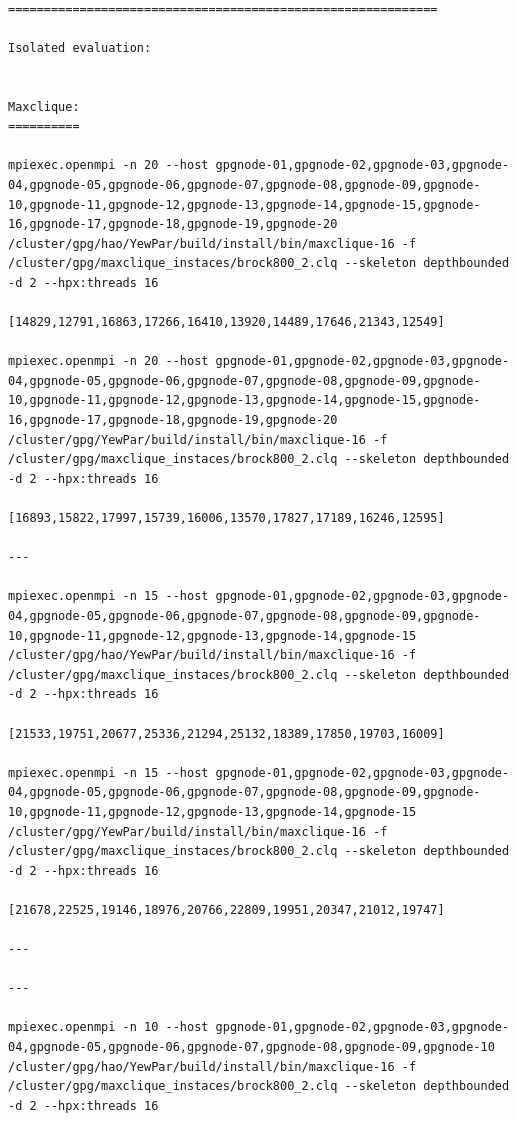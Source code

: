 \documentclass{mproj}
\begin{document}
\begin{lstlisting}

============================================================

Isolated evaluation:


Maxclique:
==========

mpiexec.openmpi -n 20 --host gpgnode-01,gpgnode-02,gpgnode-03,gpgnode-04,gpgnode-05,gpgnode-06,gpgnode-07,gpgnode-08,gpgnode-09,gpgnode-10,gpgnode-11,gpgnode-12,gpgnode-13,gpgnode-14,gpgnode-15,gpgnode-16,gpgnode-17,gpgnode-18,gpgnode-19,gpgnode-20 /cluster/gpg/hao/YewPar/build/install/bin/maxclique-16 -f /cluster/gpg/maxclique_instaces/brock800_2.clq --skeleton depthbounded -d 2 --hpx:threads 16

[14829,12791,16863,17266,16410,13920,14489,17646,21343,12549]

mpiexec.openmpi -n 20 --host gpgnode-01,gpgnode-02,gpgnode-03,gpgnode-04,gpgnode-05,gpgnode-06,gpgnode-07,gpgnode-08,gpgnode-09,gpgnode-10,gpgnode-11,gpgnode-12,gpgnode-13,gpgnode-14,gpgnode-15,gpgnode-16,gpgnode-17,gpgnode-18,gpgnode-19,gpgnode-20 /cluster/gpg/YewPar/build/install/bin/maxclique-16 -f /cluster/gpg/maxclique_instaces/brock800_2.clq --skeleton depthbounded -d 2 --hpx:threads 16

[16893,15822,17997,15739,16006,13570,17827,17189,16246,12595]

---

mpiexec.openmpi -n 15 --host gpgnode-01,gpgnode-02,gpgnode-03,gpgnode-04,gpgnode-05,gpgnode-06,gpgnode-07,gpgnode-08,gpgnode-09,gpgnode-10,gpgnode-11,gpgnode-12,gpgnode-13,gpgnode-14,gpgnode-15 /cluster/gpg/hao/YewPar/build/install/bin/maxclique-16 -f /cluster/gpg/maxclique_instaces/brock800_2.clq --skeleton depthbounded -d 2 --hpx:threads 16

[21533,19751,20677,25336,21294,25132,18389,17850,19703,16009]

mpiexec.openmpi -n 15 --host gpgnode-01,gpgnode-02,gpgnode-03,gpgnode-04,gpgnode-05,gpgnode-06,gpgnode-07,gpgnode-08,gpgnode-09,gpgnode-10,gpgnode-11,gpgnode-12,gpgnode-13,gpgnode-14,gpgnode-15 /cluster/gpg/YewPar/build/install/bin/maxclique-16 -f /cluster/gpg/maxclique_instaces/brock800_2.clq --skeleton depthbounded -d 2 --hpx:threads 16

[21678,22525,19146,18976,20766,22809,19951,20347,21012,19747]

---

---

mpiexec.openmpi -n 10 --host gpgnode-01,gpgnode-02,gpgnode-03,gpgnode-04,gpgnode-05,gpgnode-06,gpgnode-07,gpgnode-08,gpgnode-09,gpgnode-10 /cluster/gpg/hao/YewPar/build/install/bin/maxclique-16 -f /cluster/gpg/maxclique_instaces/brock800_2.clq --skeleton depthbounded -d 2 --hpx:threads 16


\end{lstlisting}
\end{document}
